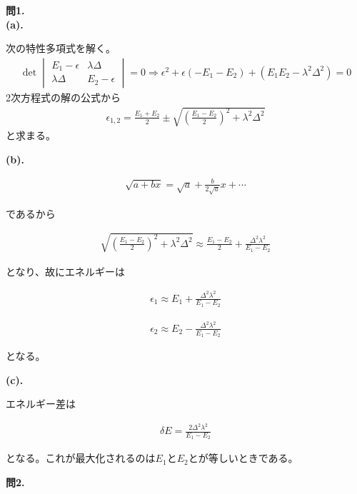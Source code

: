 \documentclass{jlreq}
\begin{document}
\noindent
\textbf{問1.}\\


\noindent
\textbf{(a).}

次の特性多項式を解く。  
\begin{eqnarray}
    \det
    \begin{vmatrix}
        E_1-\epsilon & \lambda\Delta \\
        \lambda\Delta & E_2-\epsilon 
    \end{vmatrix}=0\Rightarrow \epsilon^2+\epsilon(-E_1-E_2)+(E_1E_2-\lambda^2\Delta^2)=0   
\end{eqnarray}  
2次方程式の解の公式から
\begin{eqnarray}
    \epsilon_{1,2}=\frac{E_1+E_2}{2}\pm\sqrt{\left(\frac{E_1-E_2}{2}\right)^2+\lambda^2\Delta^2}
\end{eqnarray}  
と求まる。

\noindent
\textbf{(b).}

\begin{eqnarray}
    \sqrt{a+bx}=\sqrt{a}+\frac{b}{2\sqrt{a}}x+\cdots
\end{eqnarray}  

であるから

\begin{eqnarray}
    \sqrt{\left(\frac{E_1-E_2}{2}\right)^2+\lambda^2\Delta^2}\approx\frac{E_1-E_2}{2}+\frac{\Delta^2\lambda^2}{E_1-E_2}
\end{eqnarray}

となり、故にエネルギーは

\begin{eqnarray}
    \epsilon_1\approx E_1+\frac{\Delta^2\lambda^2}{E_1-E_2}
\end{eqnarray}

\begin{eqnarray}
    \epsilon_2\approx E_2-\frac{\Delta^2\lambda^2}{E_1-E_2}
\end{eqnarray}

となる。

\noindent
\textbf{(c).}

エネルギー差は

\begin{eqnarray}
\delta E=\frac{2\Delta^2\lambda^2}{E_1-E_2}
\end{eqnarray}

となる。これが最大化されるのは$E_1$と$E_2$とが等しいときである。

\clearpage

\noindent
\textbf{問2.}\\
\end{document}
